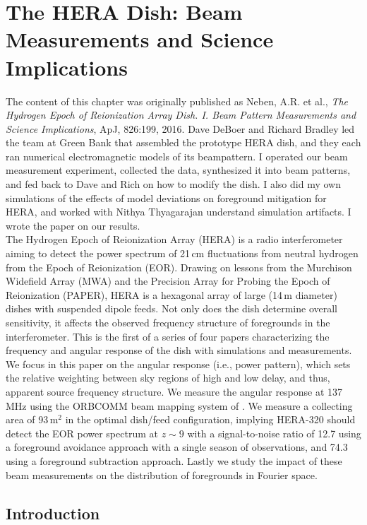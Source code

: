 
\chapter{The HERA Dish: Beam Measurements and Science Implications}
\label{chap:herapaper}
The content of this chapter was originally published as Neben, A.R. et al., \textit{The Hydrogen Epoch of Reionization Array Dish. I. Beam Pattern Measurements and Science Implications}, ApJ, 826:199, 2016. Dave DeBoer and Richard Bradley led the team at Green Bank that assembled the prototype HERA dish, and they each ran numerical electromagnetic models of its beampattern. I operated our beam measurement experiment, collected the data, synthesized it into beam patterns, and fed back to Dave and Rich on how to modify the dish. I also did my own simulations of the effects of model deviations on foreground mitigation for HERA, and worked with Nithya Thyagarajan understand simulation artifacts. I wrote the paper on our results. \\

The Hydrogen Epoch of Reionization Array (HERA) is a radio interferometer aiming to detect the power spectrum of 21\,cm fluctuations from neutral hydrogen from the Epoch of Reionization (EOR). Drawing on lessons from the Murchison Widefield Array (MWA) and the Precision Array for Probing the Epoch of Reionization (PAPER), HERA is a hexagonal array of large (14\,m diameter) dishes with suspended dipole feeds. Not only does the dish determine overall sensitivity, it affects the observed frequency structure of foregrounds in the interferometer. This is the first of a series of four papers characterizing the frequency and angular response of the dish with simulations and measurements. We focus in this paper on the angular response (i.e., power pattern), which sets the relative weighting between sky regions of high and low delay, and thus, apparent source frequency structure. We measure the angular response at 137\,MHz using the ORBCOMM beam mapping system of \citet{neben15}. We measure a collecting area of 93\,m$^2$ in the optimal dish/feed configuration, implying HERA-320 should detect the EOR power spectrum at $z\sim9$ with a signal-to-noise ratio of 12.7 using a foreground avoidance approach with a single season of observations, and 74.3 using a foreground subtraction approach. Lastly we study the impact of these beam measurements on the distribution of foregrounds in Fourier space.

\section{Introduction}

